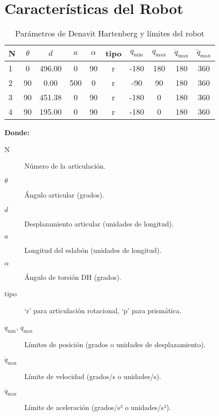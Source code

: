 \section{Características del Robot} \label{sec:caracteristicas_del_robot}

\begin{table}[ht]
	\centering
	\caption{Parámetros de Denavit Hartenberg y límites del robot}
	\label{tab:parametros_robot}
	\begin{tabular}{l|ccccccccc}
		\toprule
		N & {$\theta$} & {$d$} & {$a$} & {$\alpha$} & {tipo} 
		& {$q_{\min}$} & {$q_{\max}$} 
		& {$\dot q_{\max}$} & {$\ddot q_{\max}$} \\
		\midrule
		1 & 0   & 496.00 & 0   & 90 & r & -180 & 180 & 180 & 360 \\
		2 & 90  & 0.00   & 500 & 0  & r & -90  & 90  & 180 & 360 \\
		3 & 90  & 451.38 & 0   & 90 & r & -180 & 0   & 180 & 360 \\
		4 & 90  & 195.00 & 0   & 90 & r & -180 & 0   & 180 & 360 \\
		\bottomrule
	\end{tabular}
\end{table}

\bigskip
\noindent
\textbf{Donde:}
\begin{description}
	\item[N] Número de la articulación.
	\item[\(\theta\)] Ángulo articular (grados).
	\item[\(d\)] Desplazamiento articular (unidades de longitud).
	\item[\(a\)] Longitud del eslabón (unidades de longitud).
	\item[\(\alpha\)] Ángulo de torsión DH (grados).
	\item[tipo] ‘r’ para articulación rotacional, ‘p’ para prismática.
	\item[\(q_{\min}\), \(q_{\max}\)] Límites de posición (grados o unidades de desplazamiento).
	\item[\(\dot q_{\max}\)] Límite de velocidad (grados/s o unidades/s).
	\item[\(\ddot q_{\max}\)] Límite de aceleración (grados/s² o unidades/s²).
\end{description}

